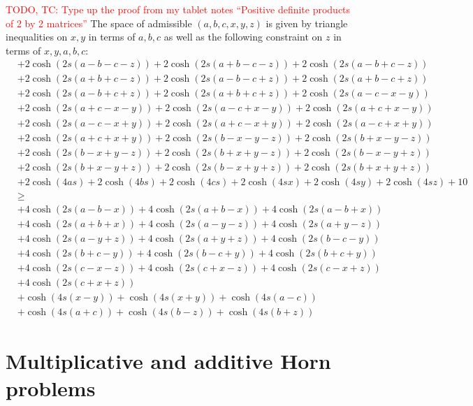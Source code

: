 \documentclass[notitlepage]{article}
\begin{document}
\textcolor{red}{TODO, TC: Type up the proof from my tablet notes ``Positive definite products of 2 by 2 matrices''}
The space of admissible $(a,b,c,x,y,z)$ is given by triangle inequalities on $x,y$ in terms of $a,b,c$ as well as the following constraint on $z$ in terms of $x,y,a,b,c$:
\begin{equation}
    \begin{split}
        &+2 \cosh (2 s (a-b-c-z))+2 \cosh (2 s (a+b-c-z))+2 \cosh (2 s (a-b+c-z))\\
        &+2 \cosh (2 s (a+b+c-z))+2 \cosh (2 s (a-b-c+z))+2 \cosh (2 s (a+b-c+z))\\
        &+2 \cosh (2 s (a-b+c+z))+2 \cosh (2 s (a+b+c+z))+2 \cosh (2 s (a-c-x-y))\\
        &+2 \cosh (2 s (a+c-x-y))+2 \cosh (2 s (a-c+x-y))+2 \cosh (2 s (a+c+x-y))\\
        &+2 \cosh (2 s (a-c-x+y))+2 \cosh (2 s (a+c-x+y))+2 \cosh (2 s (a-c+x+y))\\
        &+2 \cosh (2 s (a+c+x+y))+2 \cosh (2 s (b-x-y-z))+2 \cosh (2 s (b+x-y-z))\\
        &+2 \cosh (2 s (b-x+y-z))+2 \cosh (2 s (b+x+y-z))+2 \cosh (2 s (b-x-y+z))\\
        &+2 \cosh (2 s (b+x-y+z))+2 \cosh (2 s (b-x+y+z))+2 \cosh (2 s (b+x+y+z))\\
        &+2 \cosh (4 a s)+2 \cosh (4 b s)+2 \cosh (4 c s)+2 \cosh (4 s x)+2 \cosh (4 s y)+2 \cosh (4 s z)+10\\
        &\geq\\
        &+4 \cosh (2 s (a-b-x))+4 \cosh (2 s (a+b-x))+4 \cosh (2 s (a-b+x))\\
        &+4 \cosh (2 s (a+b+x))+4 \cosh (2 s (a-y-z))+4 \cosh (2 s (a+y-z))\\
        &+4 \cosh (2 s (a-y+z))+4 \cosh (2 s (a+y+z))+4 \cosh (2 s (b-c-y))\\
        &+4 \cosh (2 s (b+c-y))+4 \cosh (2 s (b-c+y))+4 \cosh (2 s (b+c+y))\\
        &+4 \cosh (2 s (c-x-z))+4 \cosh (2 s (c+x-z))+4 \cosh (2 s (c-x+z))\\
        &+4 \cosh (2 s (c+x+z))\\
        &+\cosh (4 s (x-y))+\cosh (4 s (x+y))+\cosh (4 s (a-c))\\
        &+\cosh (4 s (a+c))+\cosh (4 s (b-z))+\cosh (4 s (b+z))
    \end{split}
\end{equation}

\clearpage
\section{Multiplicative and additive Horn problems}
\end{document}
